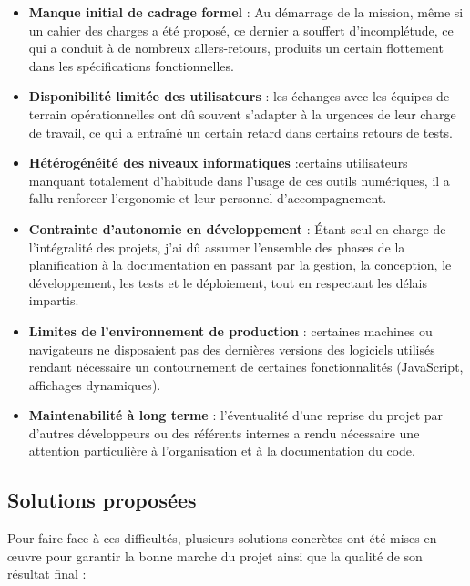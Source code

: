 \documentclass[11pt,a4paper]{article}
\begin{document}
\begin{itemize}
  \item \textbf{Manque initial de cadrage formel} :   Au démarrage de la mission, même si un cahier des charges a été proposé, ce dernier a souffert d’incomplétude, ce qui a conduit à de nombreux allers-retours, produits un certain flottement dans les spécifications fonctionnelles.
    
   \item \textbf{Disponibilité limitée des utilisateurs} :  les échanges avec les équipes de terrain opérationnelles ont dû souvent s’adapter à la urgences de leur charge de travail, ce qui a entraîné un certain retard dans certains retours de tests.
   
  \item \textbf{Hétérogénéité des niveaux informatiques} :certains utilisateurs manquant totalement d’habitude dans l’usage de ces outils numériques, il a fallu renforcer l’ergonomie et leur personnel d’accompagnement.
       
\item \textbf{Contrainte d’autonomie en développement} : Étant seul en charge de l’intégralité des projets, j’ai dû assumer l’ensemble des phases de la planification à la documentation en passant par la gestion, la conception, le développement, les tests et le déploiement, tout en respectant les délais impartis.

  \item \textbf{Limites de l’environnement de production} : certaines machines ou navigateurs ne disposaient pas des dernières versions des logiciels utilisés rendant nécessaire un contournement de certaines fonctionnalités (JavaScript, affichages dynamiques).

  \item \textbf{Maintenabilité à long terme} : l’éventualité d’une reprise du projet par d’autres développeurs ou des référents internes a rendu nécessaire une attention particulière à l’organisation et à la documentation du code.
    
\end{itemize}
\subsection{Solutions proposées}

Pour faire face à ces difficultés, plusieurs solutions concrètes ont été mises en œuvre pour garantir la bonne marche du projet ainsi que la qualité de son résultat final :  
\end{document}
